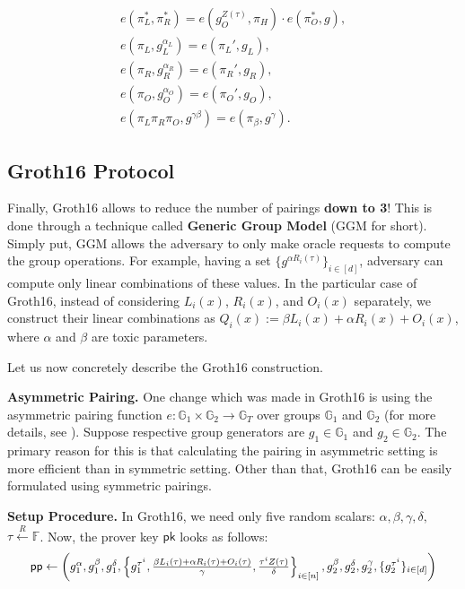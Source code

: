 \documentclass[../lecture-notes-148x210.tex]{subfiles}
\begin{document}
\begin{tcolorbox}
\begin{itemize}[label=]
    \end{itemize}
    \begin{align*}
        e(\pi_L^*, \pi_R^*) = e(g_O^{Z(\tau)}, \pi_H)\cdot e(\pi_O^*, g), \\
        e(\pi_L, g_L^{\alpha_L}) = e(\pi_L', g_L), \\
        e(\pi_R, g_R^{\alpha_R}) = e(\pi_R', g_R), \\
        e(\pi_O, g_O^{\alpha_O}) = e(\pi_O', g_O), \\
        e(\pi_L\pi_R\pi_O, g^{\gamma\beta}) = e(\pi_{\beta}, g^{\gamma}).
    \end{align*}
\end{tcolorbox}

\subsection{Groth16 Protocol}

Finally, Groth16 allows to reduce the number of pairings \textbf{down to 3}! This is done through a technique called \textbf{Generic Group Model} (GGM for short). Simply put, GGM allows the adversary to only make oracle requests to compute the group operations. For example, having a set $\{g^{\alpha R_i(\tau)}\}_{i \in [d]}$, adversary can compute only linear combinations of these values. In the particular case of Groth16, instead of considering $L_i(x)$, $R_i(x)$, and $O_i(x)$ separately, we construct their linear combinations as $Q_i(x) := \beta L_i(x) + \alpha R_i(x) + O_i(x)$, where $\alpha$ and $\beta$ are toxic parameters.

Let us now concretely describe the Groth16 construction.

\textcolor{gray!75!black}{\textbf{Asymmetric Pairing.}} One change which was made in Groth16 is using the asymmetric pairing function $e: \mathbb{G}_1 \times \mathbb{G}_2 \to \mathbb{G}_T$ over groups $\mathbb{G}_1$ and $\mathbb{G}_2$ (for more details, see ). Suppose respective group generators are $g_1 \in \mathbb{G}_1$ and $g_2 \in \mathbb{G}_2$. The primary reason for this is that calculating the pairing in asymmetric setting is more efficient than in symmetric setting. Other than that, Groth16 can be easily formulated using symmetric pairings.

\textcolor{blue!75!gray}{\textbf{Setup Procedure.}} In Groth16, we need only five random scalars: $\alpha,\beta,\gamma,\delta,$ \\ $\tau \xleftarrow{R} \mathbb{F}$. Now, the prover key $\mathsf{pk}$ looks as follows:
\begin{equation*}
    \scalebox{0.95}{$
        \mathsf{pp} \gets \left(g_1^{\alpha},g_1^{\beta},g_1^{\delta},\left\{g_1^{\tau^i},\frac{\beta L_i(\tau) + \alpha R_i(\tau) + O_i(\tau)}{\gamma}, \frac{\tau^i Z(\tau)}{\delta}\right\}_{i \in [n]},g_2^{\beta}, g_2^{\delta}, g_2^{\gamma}, \{g_2^{\tau^i}\}_{i \in [d]}\right)
    $}
\end{equation*}
\end{document}
